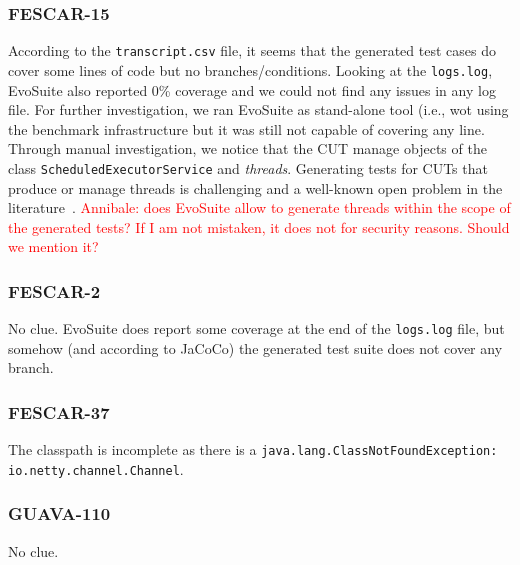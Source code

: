 \documentclass[sigconf]{acmart}
\newcommand{\EVOSUITE}{{\sc EvoSuite}\xspace}
\begin{document}

\subsubsection*{FESCAR-15} According to the \texttt{transcript.csv} file, it
seems that the generated test cases do cover some lines of code but no
branches/conditions.  Looking at the \texttt{logs.log}, \EVOSUITE also reported
0\% coverage and we could not find any issues in any log file. 
For further investigation, we ran \EVOSUITE as stand-alone tool (i.e., wot using the benchmark infrastructure but it was still not capable of covering any line. Through manual investigation, we notice that the CUT manage objects of the class \texttt{ScheduledExecutorService} and \textit{threads}. Generating tests for CUTs that produce or manage threads is challenging and a well-known open problem in the literature~\cite{FrA13a}.
\textcolor{red}{Annibale: does EvoSuite allow to generate threads within the scope of the generated tests? If I am not mistaken, it does not for security reasons. Should we mention it?
}


\subsubsection*{FESCAR-2} No clue.  \EVOSUITE does report some coverage at the
end of the \texttt{logs.log} file, but somehow (and according to JaCoCo) the
generated test suite does not cover any branch.


\subsubsection*{FESCAR-37} The classpath is incomplete as there is a
\texttt{java.lang.ClassNotFoundException: io.netty.channel.Channel}.


\subsubsection*{GUAVA-110} No clue.

\end{document}
